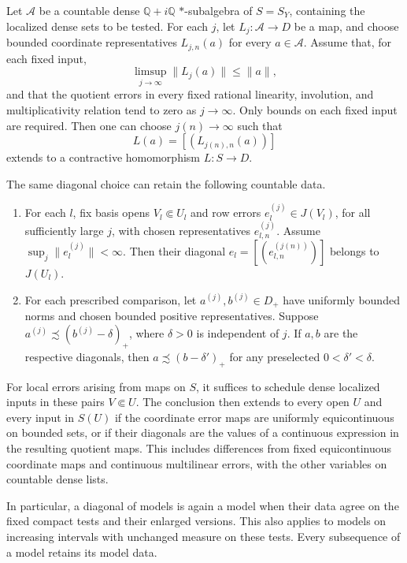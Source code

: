\begin{lemma}\label{seq:diagonal}
Let \(\mathcal A\) be a countable dense
\(\mathbb Q+i\mathbb Q\) \(*\)-subalgebra of \(S=S_Y\),
containing the localized dense sets to be tested.
For each \(j\), let \(L_j:\mathcal A\to D\) be a map, and choose
bounded coordinate representatives \(L_{j,n}(a)\) for every
\(a\in\mathcal A\). Assume that, for each fixed input,
\[
 \limsup_{j\to\infty}\|L_j(a)\|\leq\|a\|,
\]
and that the quotient errors in every fixed rational linearity,
involution, and multiplicativity relation tend to zero as
\(j\to\infty\). Only bounds on each fixed input are required.
Then one can choose \(j(n)\to\infty\) such that
\[
 L(a)=[(L_{j(n),n}(a))]
\]
extends to a contractive homomorphism \(L:S\to D\).

The same diagonal choice can retain the following countable data.
\begin{enumerate}[label=\textup{(\roman*)}]
\item For each \(l\), fix basis opens \(V_l\Subset U_l\) and
row errors \(e_l^{(j)}\in J(V_l)\), for all sufficiently large
\(j\), with chosen representatives \(e_{l,n}^{(j)}\).
Assume \(\sup_j\|e_l^{(j)}\|<\infty\).
Then their diagonal \(e_l=[(e_{l,n}^{(j(n))})]\) belongs to
\(J(U_l)\).
\item For each prescribed comparison, let
\(a^{(j)},b^{(j)}\in D_+\) have uniformly bounded norms and
chosen bounded positive representatives. Suppose
\(a^{(j)}\precsim(b^{(j)}-\delta)_+\), where \(\delta>0\)
is independent of \(j\). If \(a,b\) are the respective
diagonals, then \(a\precsim(b-\delta')_+\) for any
preselected \(0<\delta'<\delta\).
\end{enumerate}

For local errors arising from maps on \(S\), it suffices to
schedule dense localized inputs in these pairs \(V\Subset U\).
The conclusion then extends to every open \(U\) and every input
in \(S(U)\) if the coordinate error maps are uniformly equicontinuous
on bounded sets, or if their diagonals are the values of a continuous
expression in the resulting quotient maps. This includes differences
from fixed equicontinuous coordinate maps and continuous multilinear
errors, with the other variables on countable dense lists.

In particular, a diagonal of models is again a model when their
data agree on the fixed compact tests and their enlarged versions.
This also applies to models on increasing intervals with unchanged
measure on these tests. Every subsequence of a model retains its
model data.
\end{lemma}

